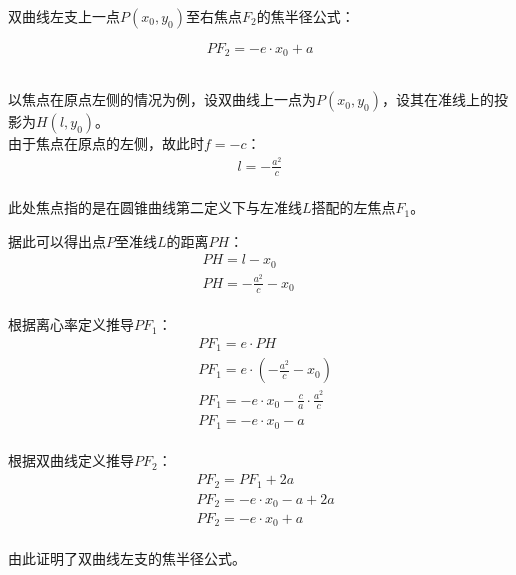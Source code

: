 \documentclass[UTF8]{ctexart}
\begin{document}
    双曲线左支上一点$P(x_0,y_0)$至右焦点$F_2$的焦半径公式：
    \begin{large}
        \begin{equation*}
            PF_2=-e\cdot x_0+a
        \end{equation*}
    \end{large}\\
    以焦点在原点左侧的情况为例，设双曲线上一点为$P(x_0,y_0)$，设其在准线上的投影为$H(l,y_0)$。\\[3mm]
    由于焦点在原点的左侧，故此时$f=-c$：
    \begin{align}
        l=-\frac{a^2}{c}
    \end{align}\\
    此处焦点指的是在圆锥曲线第二定义下与左准线$L$搭配的左焦点$F_1$。

\newpage

    据此可以得出点$P$至准线$L$的距离$PH$：
    \begin{align}
        &PH=l-x_0\\[5mm]
        &PH=-\frac{a^2}{c}-x_0~~~~~~~~~~~
    \end{align}\\
    根据离心率定义推导$PF_1$：
    \begin{align}
        &PF_1=e\cdot PH\\[5mm]
        &PF_1=e\cdot\left(-\frac{a^2}{c}-x_0\right)\\[5mm]
        &PF_1=-e\cdot x_0-\frac{c}{a}\cdot\frac{a^2}{c}\\[5mm]
        &PF_1=-e\cdot x_0-a
    \end{align}\\
    根据双曲线定义推导$PF_2$：
    \begin{align}
        &PF_2=PF_1+2a\\[5mm]
        &PF_2=-e\cdot x_0-a+2a\\[5mm]
        &PF_2=-e\cdot x_0+a
    \end{align}\\
    由此证明了双曲线左支的焦半径公式。

\newpage
\end{document}
